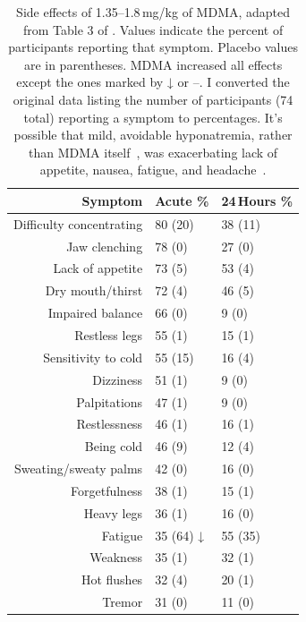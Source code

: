 \documentclass[11pt,oneside]{book}
\let\cite\parencite
\begin{document}
\begin{table}[htbp]
    \centering
    \caption{Side effects of 1.35--1.8\,mg/kg of MDMA, adapted from Table 3 of \textcite{liechtiGender}. Values indicate the percent of participants reporting that symptom. Placebo values are in parentheses. MDMA increased all effects except the ones marked by ↓ or --. I converted the original data listing the number of participants (74 total) reporting a symptom to percentages. It's possible that mild, avoidable hyponatremia, rather than MDMA itself~\cite{atilaHyponatremia}, was exacerbating lack of appetite, nausea, fatigue, and headache~\cite{mohottige2019hypovolemic}.}
    \label{table:sideeffects}
    \renewcommand{\arraystretch}{0.9}
    \begin{tabular}{|r|l|l|}
    \hline
    \textbf{Symptom} & \textbf{Acute \%} & \textbf{24\,Hours \%} \\ \hline
        Difficulty concentrating & 80 (20) & 38 (11)\\
        Jaw clenching            & 78 (0)  & 27 (0)\\
        Lack of appetite         & 73 (5)  & 53 (4)\\
        Dry mouth/thirst         & 72 (4)  & 46 (5)\\
        Impaired balance         & 66 (0)  & 9\phantom{0} (0)\\
        Restless legs            & 55 (1)  & 15 (1)\\
        Sensitivity to cold      & 55 (15) & 16 (4)\\
        Dizziness                & 51 (1)  & 9\phantom{0} (0)\\
        Palpitations             & 47 (1)  & 9\phantom{0} (0)\\
        Restlessness             & 46 (1)  & 16 (1)\\
        Being cold               & 46 (9)  & 12 (4)\\
        Sweating/sweaty palms    & 42 (0)  & 16 (0)\\
        Forgetfulness            & 38 (1)  & 15 (1)\\
        Heavy legs               & 36 (1)  & 16 (0)\\
        Fatigue                  & 35 (64) ↓ & 55 (35)\\
        Weakness                 & 35 (1)  & 32 (1)\\
        Hot flushes              & 32 (4)  & 20 (1)\\
        Tremor                   & 31 (0)  & 11 (0)\\

\end{tabular}
\end{table}
\end{document}
